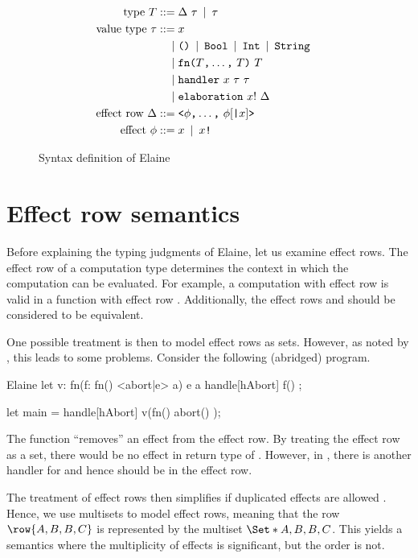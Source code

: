 \begin{figure}[p]
\begin{align*}
    \\
    \text{type}\ T
        \mathbin{\;::=\;} & \Delta\ \tau \mathbin{\;|\;} \tau\\
    \text{value type}\ \tau
        \mathbin{\;::=\;} & x \\ 
        \mathbin{\;|\;} & \text{\texttt{()}} \mathbin{\;|\;} \text{\texttt{Bool}} \mathbin{\;|\;} \text{\texttt{Int}} \mathbin{\;|\;} \text{\texttt{String}}\\
        \mathbin{\;|\;} & \text{\texttt{fn}} \text{\texttt{(}} T\text{\texttt{,}} \dots \text{\texttt{,}}\ T \text{\texttt{)}}\ T \\
        \mathbin{\;|\;} & \text{\texttt{handler}}\ x\ \tau\ \tau \\
        \mathbin{\;|\;} & \text{\texttt{elaboration}}\ x!\ \Delta \\
    \text{effect row}\ \Delta
        \mathbin{\;::=\;} & \text{\texttt{<}} \phi\text{\texttt{,}} \dots \text{\texttt{,}}\ \phi [\text{\texttt{|}} x] \text{\texttt{>}} \\
    \text{effect}\ \phi \mathbin{\;::=\;} & x \mathbin{\;|\;} x\text{\texttt{!}}
\end{align*}
\caption{Syntax definition of Elaine}
\label{fig:syntax}
\end{figure}

\section{Effect row semantics}\label{sec:effectrows}

Before explaining the typing judgments of Elaine, let us examine effect rows. The effect row of a computation type determines the context in which the computation can be evaluated. For example, a computation with effect row  is valid in a function with effect row . Additionally, the effect rows  and  should be considered to be equivalent.

One possible treatment is then to model effect rows as sets. However, as noted by \textcite{leijen_koka_2014}, this leads to some problems. Consider the following (abridged) program.
\begin{lst}{Elaine}
let v: fn(f: fn() <abort|e> a) e a {
    handle[hAbort] f()
};

let main = handle[hAbort] v(fn() { abort() });
\end{lst}
%
The function  ``removes'' an  effect from the effect row. By treating the effect row as a set, there would be no  effect in return type of . However, in , there is another handler for  and hence  should be in the effect row.

The treatment of effect rows then simplifies if duplicated effects are allowed \autocite{leijen_koka_2014}. Hence, we use multisets to model effect rows, meaning that the row $\row{A, B, B, C}$ is represented by the multiset $\S{A, B, B, C}$. This yields a semantics where the multiplicity of effects is significant, but the order is not.

